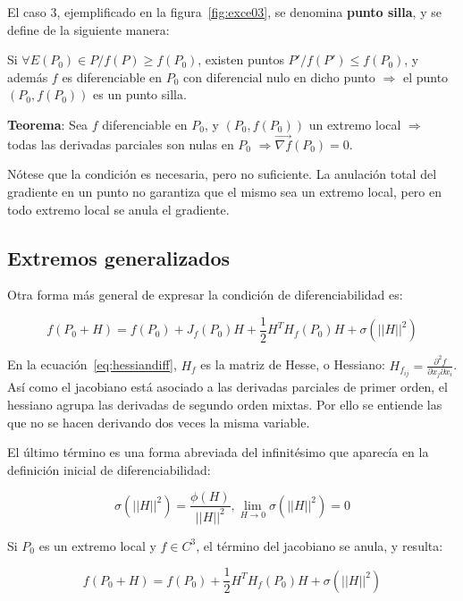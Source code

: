 \documentclass{article}
\begin{document}
El caso 3, ejemplificado en la figura~\ref{fig:exce03}, se denomina \textbf{punto silla}, y se define de la siguiente manera:

Si $\forall E(P_0) \in P / f(P) \geq f(P_0)$, existen puntos $P' / f(P') \leq f(P_0)$, y además $f$ es diferenciable en $P_0$ con diferencial nulo en dicho punto $\Rightarrow$ el punto $(P_0, f(P_0))$ es un punto silla.

\textbf{Teorema}: Sea $f$ diferenciable en $P_0$, y $(P_0, f(P_0))$ un extremo local $\Rightarrow$ todas las derivadas parciales son nulas en $P_0$ $\Rightarrow \overrightarrow{\nabla f}(P_0) = 0$.

Nótese que la condición es necesaria, pero no suficiente. La anulación total del gradiente en un punto no garantiza que el mismo sea un extremo local, pero en todo extremo local se anula el gradiente.

\subsection{Extremos generalizados}

Otra forma más general de expresar la condición de diferenciabilidad es:

\begin{equation}
f(P_0 + H) = f(P_0) + J_f(P_0) H + \frac{1}{2} H^T H_f(P_0) H + \sigma( ||H||^2 )
\label{eq:hessiandiff}
\end{equation}

En la ecuación~\ref{eq:hessiandiff}, $H_f$ es la matriz de Hesse, o Hessiano: $H_{f_{ij}} = \frac{\partial^2 f}{\partial x_j \partial x_i}$. Así como el jacobiano está asociado a las derivadas parciales de primer orden, el hessiano agrupa las derivadas de segundo orden mixtas. Por ello se entiende las que no se hacen derivando dos veces la misma variable.

El último término es una forma abreviada del infinitésimo que aparecía en la definición inicial de diferenciabilidad:

\begin{equation}
\sigma(||H||^2) = \frac{\phi(H)}{||H||^2}, \lim_{H \rightarrow 0}  \sigma(||H||^2) = 0
\end{equation}

Si $P_0$ es un extremo local y $f \in C^3$, el término del jacobiano se anula, y resulta:

\begin{equation}
f(P_0 + H) = f(P_0) + \frac{1}{2} H^T H_f(P_0) H + \sigma(||H||^2)
\end{equation}
\end{document}
